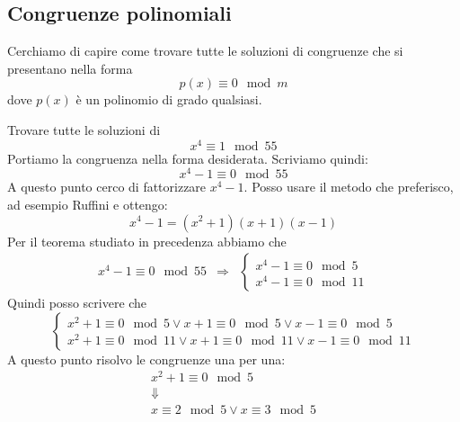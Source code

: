 \subsection{Congruenze polinomiali}
Cerchiamo di capire come trovare tutte le soluzioni di congruenze che si presentano nella forma
\begin{equation*}
	p(x) \equiv 0 \mod{m}
\end{equation*}
dove $p(x)$ \`e un polinomio di grado qualsiasi.

\begin{example}
	Trovare tutte le soluzioni di
	\begin{equation*}
		x^4 \equiv 1 \mod{55}
	\end{equation*}
	Portiamo la congruenza nella forma desiderata. Scriviamo quindi:
	\begin{equation*}
		x^4 - 1 \equiv 0 \mod{55}
	\end{equation*}
	A questo punto cerco di fattorizzare $x^4 - 1$. Posso usare il metodo che preferisco, ad
	esempio Ruffini e ottengo:
	\begin{equation*}
		x^4 - 1 = (x^2 + 1)(x + 1)(x - 1)
	\end{equation*}
	Per il teorema studiato in precedenza abbiamo che
	\begin{equation*}
		\begin{array}{rcl}
			x^4 - 1 \equiv 0 \mod{55} &
			\Rightarrow               &
			\begin{cases}
				x^4 - 1 \equiv 0 \mod{5} \\
				x^4 - 1 \equiv 0 \mod{11}
			\end{cases}
		\end{array}
	\end{equation*}
	Quindi posso scrivere che
	\begin{equation*}
		\begin{cases}
			x^2 + 1 \equiv 0 \mod{5} \vee x + 1 \equiv 0 \mod{5} \vee x - 1 \equiv 0 \mod{5} \\
			x^2 + 1 \equiv 0 \mod{11} \vee x + 1 \equiv 0 \mod{11} \vee x - 1 \equiv 0 \mod{11}
		\end{cases}
	\end{equation*}
	A questo punto risolvo le congruenze una per una:
	\begin{equation*}
		\begin{array}{c}
			x^2 + 1 \equiv 0 \mod{5}                   \\
			\Downarrow                                 \\
			x \equiv 2 \mod{5} \vee x \equiv 3 \mod{5} \\

\end{array}
\end{equation*}
\end{example}
